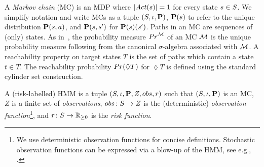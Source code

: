 \documentclass[runningheads]{llncs}
\newcommand{\Obs}{Z}
\newcommand{\act}{a}
\begin{document}
A \emph{Markov chain} (MC) is an MDP where $|\mathit{Act}(s)| = 1$ for every state $s \in S$. We simplify notation and write MCs as a tuple $\left(S, \iota,  \mathbf{P} \right)$, $\mathbf{P}(s)$ to refer to the unique distribution $\ptrans(s, \act)$, and $\mathbf{P}(s,s')$ for $\mathbf{P}(s)(s')$. Paths in an MC are sequences of (only) states.
As in~\cite{baierPrinciplesModelChecking2008},
the probability measure ${Pr}^{\mathcal{M}}$ of an MC $\mathcal{M}$ is the unique probability measure following from the canonical $\sigma$-algebra associated with $\mathcal{M}$.
A reachability property on target states $T$ is the set of paths which contain a state $t \in T$.
The reachability probability ${Pr}(\lozenge T)$ for $\lozenge T$ is defined using the standard cylinder set construction.
\begin{definition}[HMMs]
    A (risk-labelled) HMM is a tuple $\left(\Sts, \init, \ptrans, \Obs, \obsf, r \right)$ such that $\left(S, \iota, \mathbf{P} \right)$ is an MC, $\Obs$ is a finite set of \emph{observations}, $\obsf\colon \Sts \rightarrow \Obs$ is the (deterministic) \emph{observation function}\footnote{We use deterministic observation functions for concise definitions. Stochastic observation functions can be expressed via a blow-up of the HMM, see e.g., \cite{jungesRuntimeMonitorsMarkov2021}.}, and $r\colon S \to \mathbb{R}_{\geq 0}$ is the \emph{risk function}.
\end{definition}
%
%
%
%
\end{document}
